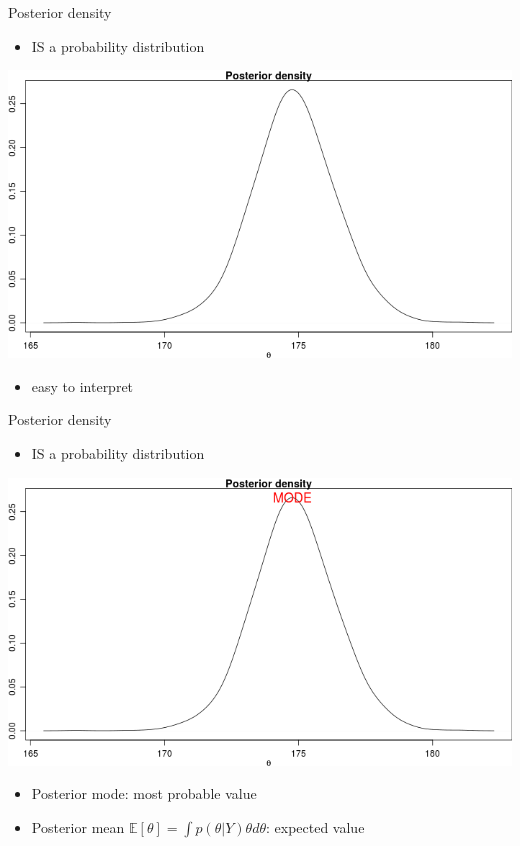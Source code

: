 \documentclass[presentation]{beamer}
\begin{document}
\begin{frame}[label=sec-11]{Posterior density}
\begin{itemize}
\item IS a probability distribution
\end{itemize}
\includegraphics[width=.9\linewidth]{posterior1.png}

\begin{itemize}
\item easy to interpret
\end{itemize}
\end{frame}

\begin{frame}[label=sec-12]{Posterior density}
\begin{itemize}
\item IS a probability distribution
\end{itemize}
\includegraphics[width=.9\linewidth]{posterior2.png}

\begin{itemize}
\item Posterior mode: most probable value
\item Posterior mean $\mathbb{E}[\theta]=\int p(\theta\vert Y)\theta d\theta$: expected value
\end{itemize}
\end{frame}
\end{document}
